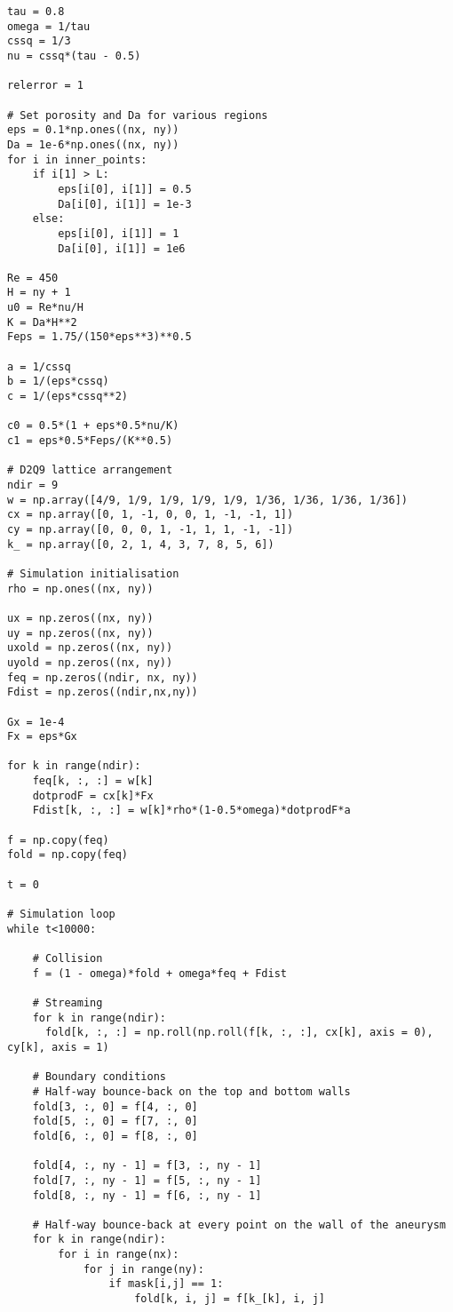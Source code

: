 \begin{mdframed}[backgroundcolor=red!10, linecolor=red!10]
\begin{verbatim}
tau = 0.8
omega = 1/tau
cssq = 1/3
nu = cssq*(tau - 0.5)

relerror = 1

# Set porosity and Da for various regions
eps = 0.1*np.ones((nx, ny))
Da = 1e-6*np.ones((nx, ny))
for i in inner_points:
    if i[1] > L:
        eps[i[0], i[1]] = 0.5
        Da[i[0], i[1]] = 1e-3
    else:
        eps[i[0], i[1]] = 1
        Da[i[0], i[1]] = 1e6

Re = 450
H = ny + 1 
u0 = Re*nu/H 
K = Da*H**2
Feps = 1.75/(150*eps**3)**0.5

a = 1/cssq
b = 1/(eps*cssq)
c = 1/(eps*cssq**2)

c0 = 0.5*(1 + eps*0.5*nu/K)
c1 = eps*0.5*Feps/(K**0.5)

# D2Q9 lattice arrangement
ndir = 9
w = np.array([4/9, 1/9, 1/9, 1/9, 1/9, 1/36, 1/36, 1/36, 1/36])
cx = np.array([0, 1, -1, 0, 0, 1, -1, -1, 1])
cy = np.array([0, 0, 0, 1, -1, 1, 1, -1, -1])
k_ = np.array([0, 2, 1, 4, 3, 7, 8, 5, 6])

# Simulation initialisation
rho = np.ones((nx, ny)) 

ux = np.zeros((nx, ny))
uy = np.zeros((nx, ny))
uxold = np.zeros((nx, ny))
uyold = np.zeros((nx, ny))
feq = np.zeros((ndir, nx, ny))
Fdist = np.zeros((ndir,nx,ny)) 

Gx = 1e-4
Fx = eps*Gx 

for k in range(ndir):
    feq[k, :, :] = w[k] 
    dotprodF = cx[k]*Fx
    Fdist[k, :, :] = w[k]*rho*(1-0.5*omega)*dotprodF*a

f = np.copy(feq)
fold = np.copy(feq)

t = 0

# Simulation loop
while t<10000: 

    # Collision
    f = (1 - omega)*fold + omega*feq + Fdist

    # Streaming
    for k in range(ndir):
      fold[k, :, :] = np.roll(np.roll(f[k, :, :], cx[k], axis = 0), cy[k], axis = 1)

    # Boundary conditions
    # Half-way bounce-back on the top and bottom walls
    fold[3, :, 0] = f[4, :, 0] 
    fold[5, :, 0] = f[7, :, 0]
    fold[6, :, 0] = f[8, :, 0]

    fold[4, :, ny - 1] = f[3, :, ny - 1]
    fold[7, :, ny - 1] = f[5, :, ny - 1]
    fold[8, :, ny - 1] = f[6, :, ny - 1]

    # Half-way bounce-back at every point on the wall of the aneurysm
    for k in range(ndir):
        for i in range(nx):
            for j in range(ny):
                if mask[i,j] == 1:
                    fold[k, i, j] = f[k_[k], i, j]


\end{verbatim}
\end{mdframed}
